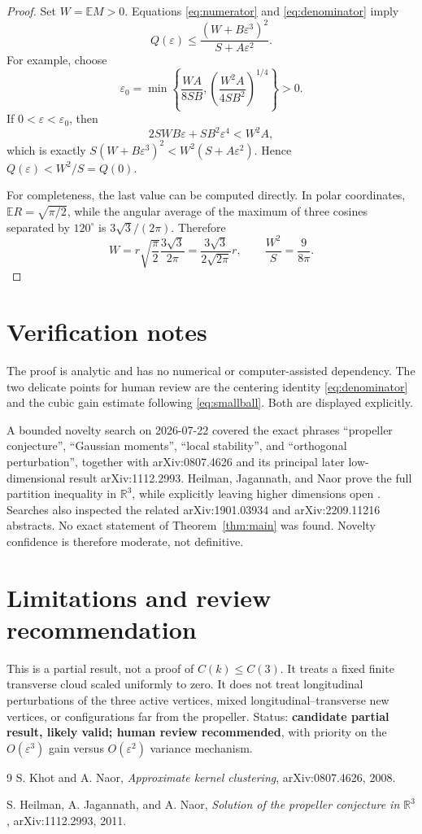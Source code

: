 \documentclass[11pt]{article}
\begin{document}
\begin{proof}
Set \(W=\mathbb E M>0\). Equations \eqref{eq:numerator} and
\eqref{eq:denominator} imply
\[
Q(\varepsilon)\le
\frac{(W+B\varepsilon^3)^2}{S+A\varepsilon^2}.
\]
For example, choose
\[
\varepsilon_0=\min\left\{
\frac{WA}{8SB},
\left(\frac{W^2A}{4SB^2}\right)^{1/4}
\right\}>0.
\]
If \(0<\varepsilon<\varepsilon_0\), then
\[
2SWB\varepsilon+SB^2\varepsilon^4<W^2A,
\]
which is exactly
\(S(W+B\varepsilon^3)^2<W^2(S+A\varepsilon^2)\).  Hence
\(Q(\varepsilon)<W^2/S=Q(0)\).

For completeness, the last value can be computed directly.  In polar
coordinates, \(\mathbb ER=\sqrt{\pi/2}\), while the angular average of the
maximum of three cosines separated by \(120^\circ\) is
\(3\sqrt3/(2\pi)\).  Therefore
\[
W=r\sqrt{\frac\pi2}\frac{3\sqrt3}{2\pi}
=\frac{3\sqrt3}{2\sqrt{2\pi}}r,
\qquad
\frac{W^2}{S}=\frac{9}{8\pi}.
\]
\end{proof}

\section*{Verification notes}

The proof is analytic and has no numerical or computer-assisted dependency.
The two delicate points for human review are the centering identity
\eqref{eq:denominator} and the cubic gain estimate following
\eqref{eq:smallball}.  Both are displayed explicitly.

A bounded novelty search on 2026-07-22 covered the exact phrases
``propeller conjecture'', ``Gaussian moments'', ``local stability'', and
``orthogonal perturbation'', together with arXiv:0807.4626 and its principal
later low-dimensional result arXiv:1112.2993.  Heilman, Jagannath, and Naor
prove the full partition inequality in \(\mathbb R^3\), while explicitly
leaving higher dimensions open \cite{HJN}.  Searches also inspected the
related arXiv:1901.03934 and arXiv:2209.11216 abstracts.  No exact statement of
Theorem~\ref{thm:main} was found.  Novelty confidence is therefore moderate,
not definitive.

\enlargethispage{4\baselineskip}
\section*{Limitations and review recommendation}

This is a partial result, not a proof of \(C(k)\le C(3)\). It treats a fixed
finite transverse cloud scaled uniformly to zero.  It does not treat
longitudinal perturbations of the three active vertices, mixed
longitudinal--transverse new vertices, or configurations far from the
propeller.  Status: \textbf{candidate partial result, likely valid; human
review recommended}, with priority on the \(O(\varepsilon^3)\) gain versus
\(O(\varepsilon^2)\) variance mechanism.

\small
\begin{thebibliography}{9}
S. Khot and A. Naor,
\emph{Approximate kernel clustering},
arXiv:0807.4626, 2008.

S. Heilman, A. Jagannath, and A. Naor,
\emph{Solution of the propeller conjecture in \(\mathbb R^3\)},
arXiv:1112.2993, 2011.
\end{thebibliography}
\normalsize
\end{document}
